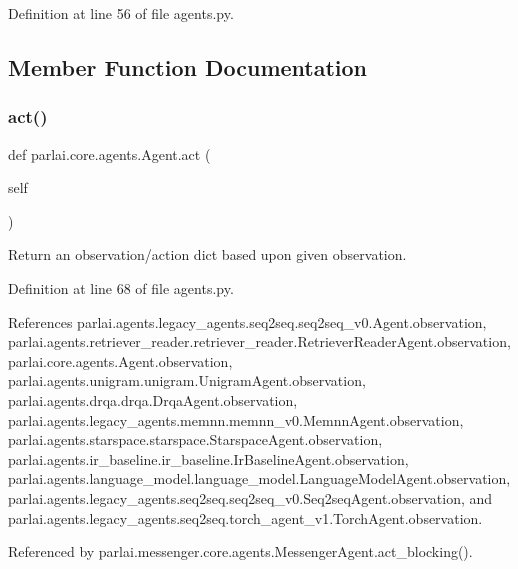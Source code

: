 Definition at line 56 of file agents.\+py.



\subsection{Member Function Documentation}
\mbox{\label{classparlai_1_1core_1_1agents_1_1Agent_a6a8abe0a98dd59bc39c9f12b163072db}} 
\subsubsection{\texorpdfstring{act()}{act()}}
{\footnotesize\ttfamily def parlai.\+core.\+agents.\+Agent.\+act (\begin{DoxyParamCaption}\item[{}]{self }\end{DoxyParamCaption})}

\begin{DoxyVerb}Return an observation/action dict based upon given observation.\end{DoxyVerb}
 

Definition at line 68 of file agents.\+py.



References parlai.\+agents.\+legacy\+\_\+agents.\+seq2seq.\+seq2seq\+\_\+v0.\+Agent.\+observation, parlai.\+agents.\+retriever\+\_\+reader.\+retriever\+\_\+reader.\+Retriever\+Reader\+Agent.\+observation, parlai.\+core.\+agents.\+Agent.\+observation, parlai.\+agents.\+unigram.\+unigram.\+Unigram\+Agent.\+observation, parlai.\+agents.\+drqa.\+drqa.\+Drqa\+Agent.\+observation, parlai.\+agents.\+legacy\+\_\+agents.\+memnn.\+memnn\+\_\+v0.\+Memnn\+Agent.\+observation, parlai.\+agents.\+starspace.\+starspace.\+Starspace\+Agent.\+observation, parlai.\+agents.\+ir\+\_\+baseline.\+ir\+\_\+baseline.\+Ir\+Baseline\+Agent.\+observation, parlai.\+agents.\+language\+\_\+model.\+language\+\_\+model.\+Language\+Model\+Agent.\+observation, parlai.\+agents.\+legacy\+\_\+agents.\+seq2seq.\+seq2seq\+\_\+v0.\+Seq2seq\+Agent.\+observation, and parlai.\+agents.\+legacy\+\_\+agents.\+seq2seq.\+torch\+\_\+agent\+\_\+v1.\+Torch\+Agent.\+observation.



Referenced by parlai.\+messenger.\+core.\+agents.\+Messenger\+Agent.\+act\+\_\+blocking().

